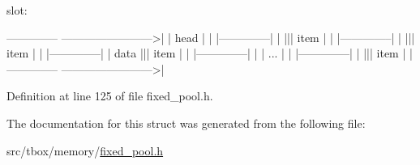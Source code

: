 \begin{DoxyPre}slot:\end{DoxyPre}



\begin{DoxyPre} -------------- ------------------------>|
|     head     |                         |
|--------------|                         |
|||   item     |                         |  
|--------------|                         |
|||   item     |                         |  
|--------------|                         | data
|||   item     |                         |  
|--------------|                         | 
|      ...     |                         |  
|--------------|                         | 
|||   item     |                         | 
 -------------- ------------------------>|\end{DoxyPre}



\begin{DoxyPre}\end{DoxyPre}
 

Definition at line 125 of file fixed\-\_\-pool.\-h.



The documentation for this struct was generated from the following file\-:\begin{DoxyCompactItemize}
\item 
src/tbox/memory/\hyperlink{fixed__pool_8h}{fixed\-\_\-pool.\-h}\end{DoxyCompactItemize}
